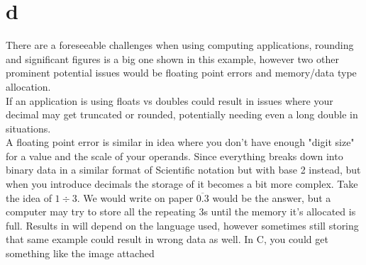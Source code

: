 \documentclass{article}
\begin{document}
\section*{d}
There are a foreseeable challenges when using computing applications, rounding and significant figures is a big one shown in this example, however two other prominent potential issues would be floating point errors and memory/data type allocation. 
\\
If an application is using floats vs doubles could result in issues where your decimal may get truncated or rounded, potentially needing even a long double in situations. 
\\
A floating point error is similar in idea where you don't have enough "digit size" for a value and the scale of your operands. Since everything breaks down into binary data in a similar format of Scientific notation but with base 2 instead, but when you introduce decimals the storage of it becomes a bit more complex. Take the idea of $ 1 \div 3$. We would write on paper $\overline{0.3}$ would be the answer, but a computer may try to store all the repeating 3s until the memory it's allocated is full. Results in will depend on the language used, however sometimes still storing that same example could result in wrong data as well. In C, you could get something like the image attached 
\end{document}
